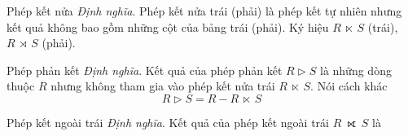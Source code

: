 \documentclass[11pt]{beamer}
\begin{document}
  \begin{frame}{Phép kết nửa}
    \textit{Định nghĩa}. Phép kết nửa trái (phải) là phép kết tự nhiên nhưng kết quả không bao gồm
    những cột của bảng trái (phải). Ký hiệu $R~⋉~S$ (trái), $R~⋊~S$ (phải).
  \end{frame}
  \begin{frame}{Phép phản kết}
    \textit{Định nghĩa}. Kết quả của phép phản kết $R \rhd S$ là những dòng thuộc $R$ nhưng không tham gia
    vào phép kết nửa trái $R~⋉~S$. Nói cách khác
    $$
    R \rhd S = R - R~⋉~S
    $$
  \end{frame}
  \begin{frame}{Phép kết ngoài trái}
    \textit{Định nghĩa}. Kết quả của phép kết ngoài trái $R~⟖~S$ là 
  \end{frame}
\end{document}
